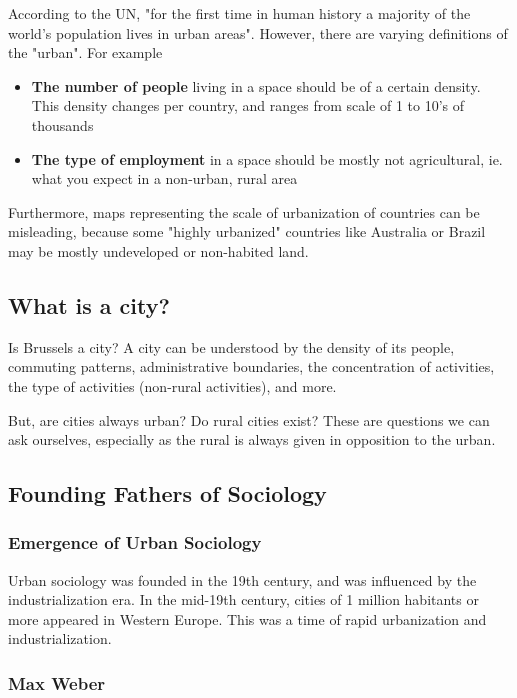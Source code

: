 \documentclass{article}
\begin{document}
According to the UN, "for the first time in human history a majority of the world's population lives in urban areas". However, there are varying definitions of the "urban". For example
\begin{itemize}
  \item \textbf{The number of people} living in a space should be of a certain density. This density changes per country, and ranges from scale of 1 to 10's of thousands
  \item \textbf{The type of employment} in a space should be mostly not agricultural, ie. what you expect in a non-urban, rural area
\end{itemize}

Furthermore, maps representing the scale of urbanization of countries can be misleading, because some "highly urbanized" countries like Australia or Brazil may be mostly undeveloped or non-habited land. 
  
\subsection{What is a city?}

Is Brussels a city? A city can be understood by the density of its people, commuting patterns, administrative boundaries, the concentration of activities, the type of activities (non-rural activities), and more.

But, are cities always urban? Do rural cities exist? These are questions we can ask ourselves, especially as the rural is always given in opposition to the urban.

\subsection{Founding Fathers of Sociology}

\subsubsection{Emergence of Urban Sociology}

Urban sociology was founded in the 19th century, and was influenced by the industrialization era. 
In the mid-19th century, cities of 1 million habitants or more appeared in Western Europe. This was a time of rapid urbanization and industrialization. 

\subsubsection{Max Weber}
\end{document}
